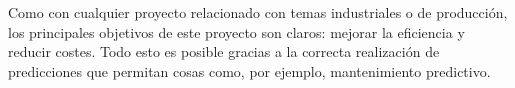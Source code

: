 
Como con cualquier proyecto relacionado con temas industriales o de producción, los principales objetivos
de este proyecto son claros: mejorar la eficiencia y reducir costes. Todo esto es posible gracias a la 
correcta realización de predicciones que permitan cosas como, por ejemplo, mantenimiento predictivo. 